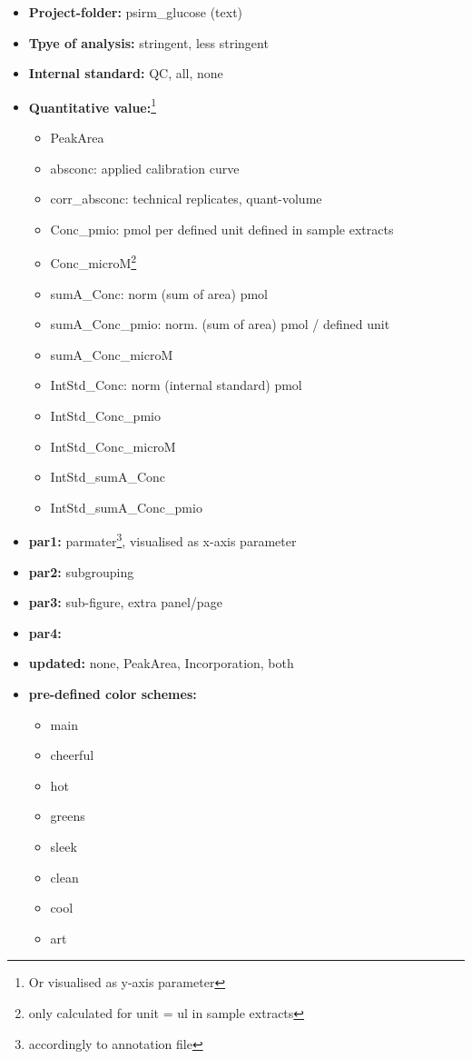 \documentclass[]{book}
\providecommand{\tightlist}{%
  \setlength{\itemsep}{0pt}\setlength{\parskip}{0pt}}
\let\rmarkdownfootnote\footnote%
\def\footnote{\protect\rmarkdownfootnote}
\begin{document}
\begin{itemize}
\tightlist
\item
  \textbf{Project-folder:} psirm\_glucose (text)
\item
  \textbf{Tpye of analysis:} stringent, less stringent
\item
  \textbf{Internal standard:} QC, all, none
\item
  \textbf{Quantitative value:}\footnote{Or visualised as y-axis parameter}

  \begin{itemize}
  \tightlist
  \item
    PeakArea
  \item
    absconc: applied calibration curve
  \item
    corr\_absconc: technical replicates, quant-volume
  \item
    Conc\_pmio: pmol per defined unit defined in sample extracts
  \item
    Conc\_microM\footnote{only calculated for unit = ul in sample extracts}
  \item
    sumA\_Conc: norm (sum of area) pmol
  \item
    sumA\_Conc\_pmio: norm. (sum of area) pmol / defined unit
  \item
    sumA\_Conc\_microM
  \item
    IntStd\_Conc: norm (internal standard) pmol
  \item
    IntStd\_Conc\_pmio
  \item
    IntStd\_Conc\_microM
  \item
    IntStd\_sumA\_Conc
  \item
    IntStd\_sumA\_Conc\_pmio
  \end{itemize}
\item
  \textbf{par1:} parmater\footnote{accordingly to annotation file}, visualised as x-axis parameter
\item
  \textbf{par2:} subgrouping
\item
  \textbf{par3:} sub-figure, extra panel/page
\item
  \textbf{par4:}
\item
  \textbf{updated:} none, PeakArea, Incorporation, both
\item
  \textbf{pre-defined color schemes:}

  \begin{itemize}
  \tightlist
  \item
    main
  \item
    cheerful
  \item
    hot
  \item
    greens
  \item
    sleek
  \item
    clean
  \item
    cool
  \item
    art
  \end{itemize}
\end{itemize}
\end{document}
